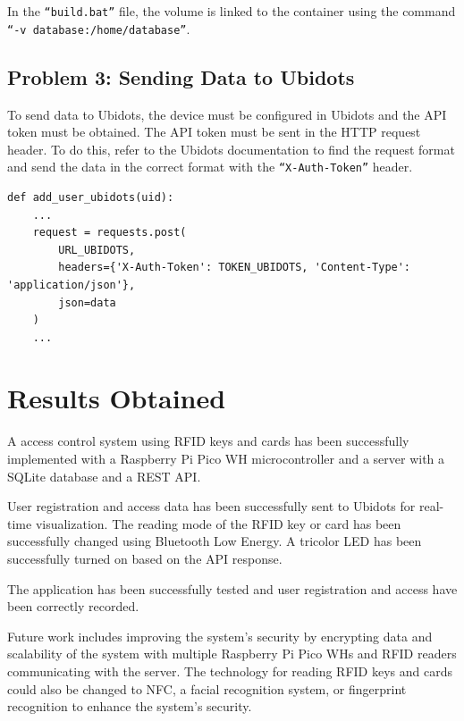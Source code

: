 \documentclass{article}
\begin{document}
In the \texttt{``build.bat''} file, the volume is linked to the container using the command \texttt{``-v database:/home/database''}.

\subsection{Problem 3: Sending Data to Ubidots}

To send data to Ubidots, the device must be configured in Ubidots and the API token must be obtained. The API token must be sent in the HTTP request header. To do this, refer to the Ubidots documentation to find the request format and send the data in the correct format with the \texttt{``X-Auth-Token''} header.

\begin{lstlisting}
def add_user_ubidots(uid):
    ...
    request = requests.post(
        URL_UBIDOTS,
        headers={'X-Auth-Token': TOKEN_UBIDOTS, 'Content-Type': 'application/json'},
        json=data
    )
    ...
\end{lstlisting}


\section{Results Obtained}

A access control system using RFID keys and cards has been successfully implemented with a Raspberry Pi Pico WH microcontroller and a server with a SQLite database and a REST API. 

User registration and access data has been successfully sent to Ubidots for real-time visualization. The reading mode of the RFID key or card has been successfully changed using Bluetooth Low Energy. A tricolor LED has been successfully turned on based on the API response. 

The application has been successfully tested and user registration and access have been correctly recorded. 

Future work includes improving the system's security by encrypting data and scalability of the system with multiple Raspberry Pi Pico WHs and RFID readers communicating with the server. The technology for reading RFID keys and cards could also be changed to NFC, a facial recognition system, or fingerprint recognition to enhance the system's security.

\newpage
\listoffigures



\end{document}
